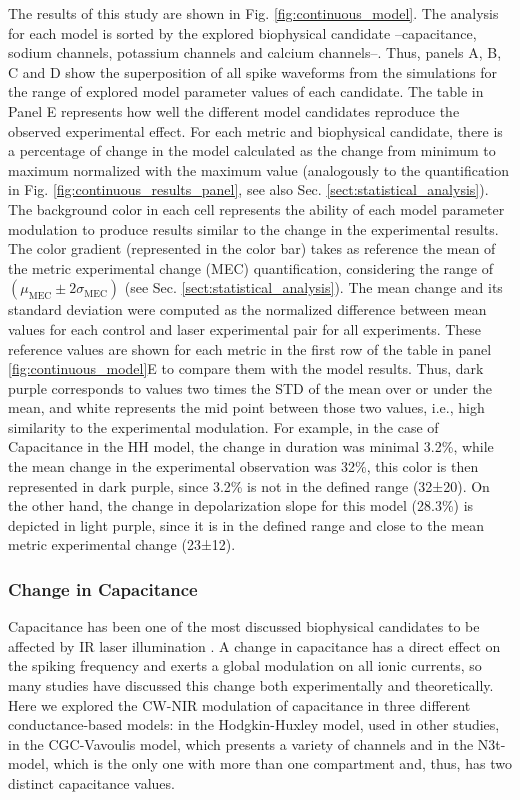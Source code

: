 The results of this study are shown in Fig. \ref{fig:continuous_model}. The analysis for each model is sorted by the explored biophysical candidate --capacitance, sodium channels, potassium channels and calcium channels--. Thus, panels A, B, C and D show the superposition of all spike waveforms from the simulations for the range of explored model parameter values of each candidate. The table in Panel E represents how well the different model candidates reproduce the observed experimental effect. For each metric and biophysical candidate, there is a percentage of change in the model calculated as the change from minimum to maximum normalized with the maximum value (analogously to the quantification in Fig. \ref{fig:continuous_results_panel}, see also Sec. \ref{sect:statistical_analysis}). The background color in each cell represents the ability of each model parameter modulation to produce results similar to the change in the experimental results. The color gradient (represented in the color bar) takes as reference the mean of the metric experimental change (MEC) quantification, considering the range of $(\mu_{\textrm{MEC}}\pm2\sigma_{\textrm{MEC}})$ (see Sec. \ref{sect:statistical_analysis}). The mean change and its standard deviation were computed as the normalized difference between mean values for each control and laser experimental pair for all experiments. These reference values are shown for each metric in the first row of the table in panel \ref{fig:continuous_model}E to compare them with the model results. Thus, dark purple corresponds to values two times the STD of the mean over or under the mean, and white represents the mid point between those two values, i.e., high similarity to the experimental modulation. For example, in the case of Capacitance in the HH model, the change in duration was minimal 3.2\%, while the mean change in the experimental observation was 32\%, this color is then represented in dark purple, since 3.2\% is not in the defined range (32±20). On the other hand, the change in depolarization slope for this model (28.3\%) is depicted in light purple, since it is in the defined range and close to the mean metric experimental change (23±12).


\subsubsection{Change in Capacitance}
Capacitance has been one of the most discussed biophysical candidates to be affected by IR laser illumination \parencite{shapiro_infrared_2012, shapiro_correction_2017,cayce_infrared_2014, plaksin_thermal_2018}. A change in capacitance has a direct effect on the spiking frequency and exerts a global modulation on all ionic currents, so many studies have discussed this change both experimentally and theoretically.
Here we explored the CW-NIR modulation of capacitance in three different conductance-based models: in the Hodgkin-Huxley model, used in other studies, in the CGC-Vavoulis model, which presents a variety of channels and in the N3t-model, which is the only one with more than one compartment and, thus, has two distinct capacitance values. 

